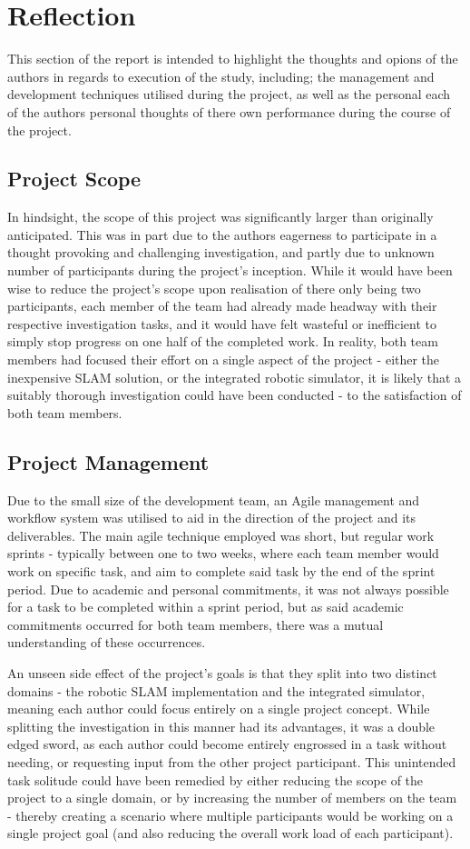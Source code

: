 \section{Reflection}
This section of the report is intended to highlight the thoughts and opions of
the authors in regards to execution of the study, including; the management
and development techniques utilised during the project, as well as the personal
each of the authors personal thoughts of there own performance during the
course of the project.


\subsection{Project Scope}
In hindsight, the scope of this project was significantly larger than originally
anticipated.
This was in part due to the authors eagerness to participate in a thought
provoking and challenging investigation, and partly due to unknown number of
participants during the project's inception.
While it would have been wise to reduce the project's scope upon realisation
of there only being two participants, each member of the team had already made
headway with their respective investigation tasks, and it would have felt
wasteful or inefficient to simply stop progress on one half of the completed
work.
In reality, both team members had focused their effort on a single aspect of
the project - either the inexpensive SLAM solution, or the integrated robotic
simulator, it is likely that a suitably thorough investigation could have been
conducted - to the satisfaction of both team members.


\subsection{Project Management}
Due to the small size of the development team, an Agile management and
workflow system was utilised to aid in the direction of the project and its
deliverables.
The main agile technique employed was short, but regular work sprints - 
typically between one to two weeks, where each team member would work on
specific task, and aim to complete said task by the end of the sprint period.
Due to academic and personal commitments, it was not always possible for a task
to be completed within a sprint period, but as said academic commitments
occurred for both team members, there was a mutual understanding of these
occurrences.

An unseen side effect of the project's goals is that they split into two
distinct domains - the robotic SLAM implementation and the integrated
simulator, meaning each author could focus entirely on a single project
concept.
While splitting the investigation in this manner had its advantages, it was a
double edged sword, as each author could become entirely engrossed in a task
without needing, or requesting input from the other project participant.
This unintended task solitude could have been remedied by either reducing the
scope of the project to a single domain, or by increasing the number of
members on the team - thereby creating a scenario where multiple participants
would be working on a single project goal (and also reducing the overall work
load of each participant).

